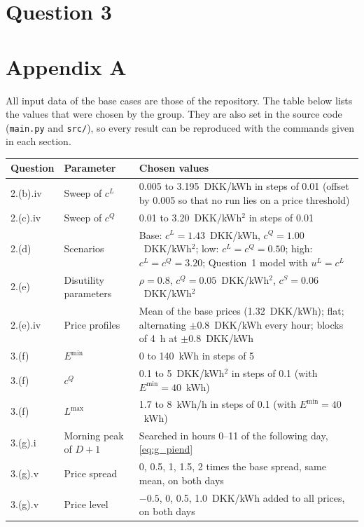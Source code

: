 \documentclass[12pt,oneside,a4paper,english]{article}
\newcommand{\Emin}{E^{\min}}
\newcommand{\uL}{u^{L}}
\newcommand{\Lmax}{L^{\max}}
\begin{document}
\newpage
\section{Question 3}


\newpage
\section{Appendix A} \label{ch6}

All input data of the base cases are those of the repository. The table below lists the values
that were chosen by the group. They are also set in the source code
(\texttt{main.py} and \texttt{src/}), so every result can be reproduced with the commands given in
each section.

\begin{table}[H]
\centering
\small
\begin{tabularx}{\textwidth}{llX}
\toprule
\textbf{Question} & \textbf{Parameter} & \textbf{Chosen values} \\
\midrule
2.(b).iv & Sweep of $c^{L}$ & 0.005 to 3.195~DKK/kWh in steps of 0.01 (offset by 0.005 so that no run lies on a price threshold) \\
2.(c).iv & Sweep of $c^{Q}$ & 0.01 to 3.20~DKK/kWh$^2$ in steps of 0.01 \\
2.(d) & Scenarios & Base: $c^{L} = 1.43$~DKK/kWh, $c^{Q} = 1.00$~DKK/kWh$^2$; low: $c^{L} = c^{Q} = 0.50$; high: $c^{L} = c^{Q} = 3.20$; Question~1 model with $\uL = c^{L}$ \\
2.(e) & Disutility parameters & $\rho = 0.8$, $c^{Q} = 0.05$~DKK/kWh$^2$, $c^{S} = 0.06$~DKK/kWh$^2$ \\
2.(e).iv & Price profiles & Mean of the base prices (1.32~DKK/kWh); flat; alternating $\pm 0.8$~DKK/kWh every hour; blocks of 4~h at $\pm 0.8$~DKK/kWh \\
\midrule
3.(f) & $\Emin$ & 0 to 140~kWh in steps of 5 \\
3.(f) & $c^{Q}$ & 0.1 to 5~DKK/kWh$^2$ in steps of 0.1 (with $\Emin = 40$~kWh) \\
3.(f) & $\Lmax$ & 1.7 to 8~kWh/h in steps of 0.1 (with $\Emin = 40$~kWh) \\
\midrule
3.(g).i & Morning peak of $D+1$ & Searched in hours 0--11 of the following day, \eqref{eq:g_piend} \\
3.(g).v & Price spread & 0, 0.5, 1, 1.5, 2 times the base spread, same mean, on both days \\
3.(g).v & Price level & $-0.5$, 0, 0.5, 1.0~DKK/kWh added to all prices, on both days \\

\end{tabularx}
\end{table}
\end{document}
